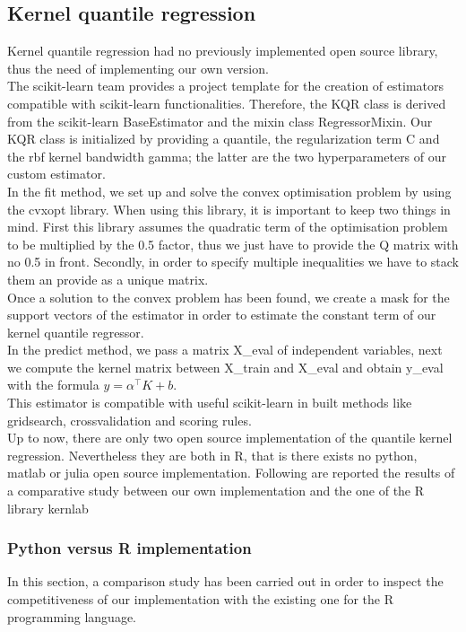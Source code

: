 \subsection{Kernel quantile regression}
Kernel quantile regression had no previously implemented open source library, thus the need of implementing our own version.
\\
The scikit-learn team provides a project template for the creation of estimators compatible with scikit-learn functionalities. Therefore, the KQR class is derived from the scikit-learn BaseEstimator and the mixin class RegressorMixin.
Our KQR class is initialized by providing a quantile, the regularization term C and the rbf kernel bandwidth gamma; the latter are the two hyperparameters of our custom estimator.
\\
In the fit method, we set up and solve the convex optimisation problem by using the cvxopt library. 
When using this library, it is important to keep two things in mind. First this library assumes the quadratic term of the optimisation problem to be multiplied by the 0.5 factor, thus we just have to provide the Q matrix with no 0.5 in front.
Secondly, in order to specify multiple inequalities we have to stack them an provide as a unique matrix.
\\
Once a solution to the convex problem has been found, we create a mask for the support vectors of the estimator in order to estimate the constant term of our kernel quantile regressor.
\\
In the predict method, we pass a matrix X\_eval of independent variables, next we compute the kernel matrix between X\_train and X\_eval and obtain y\_eval with the formula $y=\alpha^\intercal K+b$.
\\
This estimator is compatible with useful scikit-learn in built methods like gridsearch, crossvalidation and scoring rules.
\\
Up to now, there are only two open source implementation of the quantile kernel regression. Nevertheless they are both in R, that is there exists no python, matlab or julia open source implementation. Following are reported the results of a comparative study between our own implementation and the one of the R library kernlab
\subsubsection{Python versus R implementation}
In this section, a comparison study has been carried out in order to inspect the competitiveness of our implementation with the existing one for the R programming language.